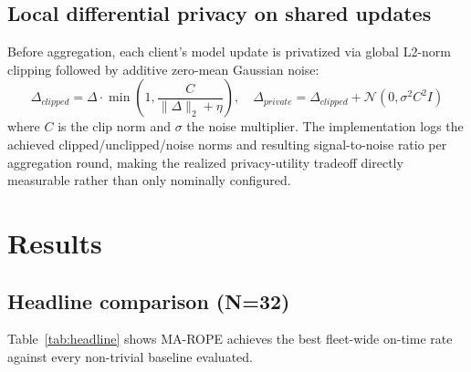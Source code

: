 \documentclass[10pt,twocolumn]{article}
\begin{document}
\subsection{Local differential privacy on shared updates}
Before aggregation, each client's model update is privatized via global L2-norm clipping followed
by additive zero-mean Gaussian noise:
\begin{equation}
\Delta_{clipped} = \Delta \cdot \min\left(1, \frac{C}{\|\Delta\|_2 + \eta}\right), \quad
\Delta_{private} = \Delta_{clipped} + \mathcal{N}(0, \sigma^2 C^2 I)
\end{equation}
where $C$ is the clip norm and $\sigma$ the noise multiplier. The implementation logs the achieved
clipped/unclipped/noise norms and resulting signal-to-noise ratio per aggregation round, making the
realized privacy-utility tradeoff directly measurable rather than only nominally configured.

\section{Results}
\label{sec:results}

\subsection{Headline comparison (N=32)}
Table~\ref{tab:headline} shows MA-ROPE achieves the best fleet-wide on-time rate against every
non-trivial baseline evaluated.

\begin{table}[t]
\centering
\caption{Headline comparison at N=32 (mean $\pm$ population std, 5 seeds)}
\label{tab:headline}
\end{table}
\end{document}

